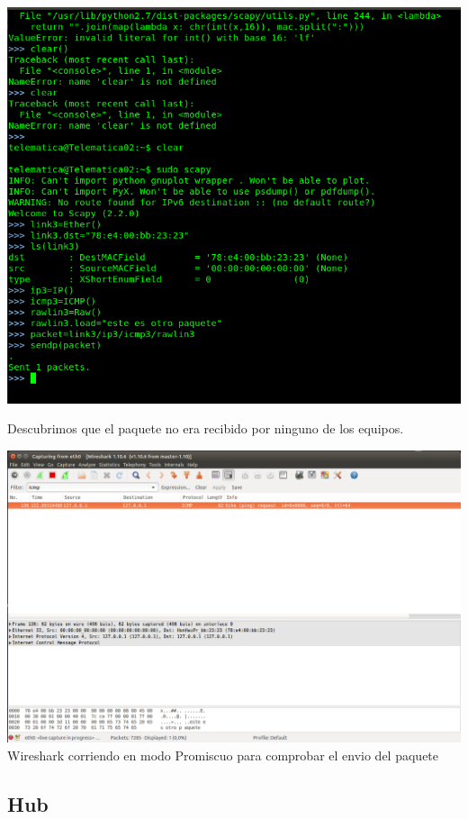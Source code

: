 \documentclass[spanish]{udpreport}
\begin{document}
\begin{center}
	\includegraphics[scale=.37]{imagenes/Switch/Test_3.png}
\end{center}

Descubrimos que el paquete no era recibido por ninguno de los equipos.

\begin{center}
	\includegraphics[scale=.27]{imagenes/Switch/Test_3_Wireshark.png}
	\\ Wireshark corriendo en modo Promiscuo para comprobar el envio del paquete
\end{center}

\newpage


\subsection{Hub}
\end{document}
